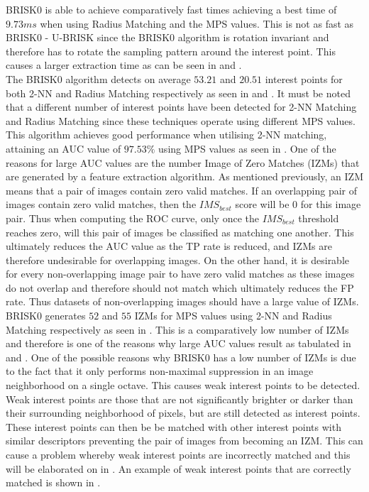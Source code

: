 \documentclass[11pt]{report}
\begin{document}
BRISK0 is able to achieve comparatively fast times achieving a best time of $9.73 ms$ when using Radius Matching and the MPS values. This is not as fast as BRISK0 - U-BRISK since the BRISK0 algorithm is rotation invariant and therefore has to rotate the sampling pattern around the interest point. This causes a larger extraction time as can be seen in  and .\\

The BRISK0 algorithm detects on average $53.21$ and $20.51$ interest points for both 2-NN and Radius Matching respectively as seen in  and . It must be noted that a different number of interest points have been detected for 2-NN Matching and Radius Matching since these techniques operate using different MPS values. \\

This algorithm achieves good performance when utilising 2-NN matching, attaining an AUC value of $97.53\%$ using MPS values as seen in . One of the reasons for large AUC values are the number Image of Zero Matches (IZMs) that are generated by a feature extraction algorithm. As mentioned previously, an IZM means that a pair of images contain zero valid matches. If an overlapping pair of images contain zero valid matches, then the $IMS_{best}$ score will be $0$ for this image pair. Thus when computing the ROC curve, only once the $IMS_{best}$ threshold reaches zero, will this pair of images be classified as matching one another. This ultimately reduces the AUC value as the TP rate is reduced, and IZMs are therefore undesirable for overlapping images. On the other hand, it is desirable for every non-overlapping image pair to have zero valid matches as these images do not overlap and therefore should not match which ultimately reduces the FP rate. Thus datasets of non-overlapping images should have a large value of IZMs.\\

BRISK0 generates $52$ and $55$ IZMs for MPS values using 2-NN and Radius Matching respectively as seen in . This is a comparatively low number of IZMs and therefore is one of the reasons why large AUC values result as tabulated in  and . One of the possible reasons why BRISK0 has a low number of IZMs is due to the fact that it only performs non-maximal suppression in an image neighborhood on a single octave. This causes weak interest points to be detected. Weak interest points are those that are not significantly brighter or darker than their surrounding neighborhood of pixels, but are still detected as interest points. These interest points can then be be matched with other interest points with similar descriptors preventing the pair of images from becoming an IZM. This can cause a problem whereby weak interest points are incorrectly matched and this will be elaborated on in . An example of weak interest points that are correctly matched is shown in .\\
\end{document}
